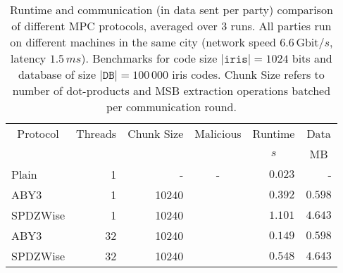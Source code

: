 \documentclass[a4paper,11pt,
]{article}
\newcommand{\cmark}{\ding{51}}%
\newcommand{\xmark}{\ding{55}}%
\begin{document}
\begin{table}[ht]
    \centering
    \caption{Runtime and communication (in data sent per party) comparison of different MPC protocols, averaged over 3 runs. All parties run on different machines in the same city (network speed $6.6\,\text{Gbit}/s$, latency $1.5\,ms$). Benchmarks for code size $|\texttt{iris}| = 1024$ bits and database of size $|\texttt{DB}| = 100\,000$ iris codes. Chunk Size refers to number of dot-products and MSB extraction operations batched per communication round.}
    \label{tab::bench_network_100k_iris_small}
    \begin{tabular}{lrrcrr}
        \toprule
        \multicolumn{1}{c}{Protocol} & \multicolumn{1}{c}{Threads} & \multicolumn{1}{c}{Chunk Size} & \multicolumn{1}{c}{Malicious} & \multicolumn{1}{c}{Runtime} & \multicolumn{1}{c}{Data} \\
                                     &                             &                                &                               & \multicolumn{1}{c}{$s$}     & \multicolumn{1}{c}{MB}   \\
        \midrule
        Plain                        & 1                           & -                              & -                             & $0.023$                     & -                        \\
        ABY3                         & 1                           & 10240                          & \xmark                        & $0.392$                     & $0.598$                  \\
        SPDZWise                     & 1                           & 10240                          & \cmark                        & $1.101$                     & $4.643$                  \\
        \midrule
        ABY3                         & 32                          & 10240                          & \xmark                        & $0.149$                     & $0.598$                  \\
        SPDZWise                     & 32                          & 10240                          & \cmark                        & $0.548$                     & $4.643$                  \\
        \bottomrule
    \end{tabular}
\end{table}
\end{document}
